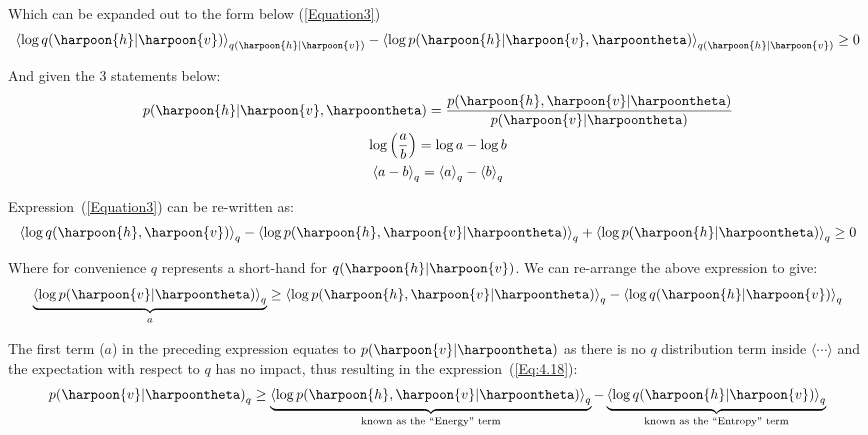 Which can be expanded out to the form below (\ref{Equation3})
\begin{equation}\label{Equation3}
    {\left\langle \log q {(\harpoon{h}|\harpoon{v})}\right\rangle}_{q{(\harpoon{h}|\harpoon{v})}} -
    {\left\langle\log p {(\harpoon{h}|\harpoon{v},\harpoontheta)}\right\rangle}_{q{(\harpoon{h}|\harpoon{v})}}
    \geq 0
\end{equation}

And given the 3 statements below:
\begin{gather}
    p {(\harpoon{h}|\harpoon{v},\harpoontheta)} = 
        \dfrac{ p {(\harpoon{h},\harpoon{v}|\harpoontheta)}}
              { p {(\harpoon{v}|\harpoontheta)}} \\
    \log {\left(\dfrac{a}{b}\right)} = \log a - \log b \\
    {\left\langle a-b \right\rangle}_{q} = {\left\langle a \right\rangle}_{q} - {\left\langle b \right\rangle}_{q}
\end{gather}

Expression~(\ref{Equation3}) can be re-written as:
\begin{equation}
    {\left\langle \log q (\harpoon{h},\harpoon{v}) \right\rangle}_{q} -
    {\left\langle \log p (\harpoon{h},\harpoon{v}|\harpoontheta) \right\rangle}_{q} +
    {\left\langle \log p (\harpoon{h}|\harpoontheta) \right\rangle}_{q}
    \geq 0
\end{equation}

Where for convenience $q$ represents a short-hand for $q( \harpoon{h}|\harpoon{v} )$. We can re-arrange the above expression to give:
\begin{equation}
    \underbrace{{\left\langle \log p (\harpoon{v}|\harpoontheta) \right\rangle}_{q}}_{a}
    \geq
    {\left\langle \log p (\harpoon{h},\harpoon{v}|\harpoontheta) \right\rangle}_{q} -
    {\left\langle \log q (\harpoon{h}|\harpoon{v}) \right\rangle}_{q}
\end{equation}

The first term ($a$) in the preceding expression equates to $p (\harpoon{v}|\harpoontheta)$ as there is no $q$ distribution term inside $\langle\cdots\rangle$ and the expectation with respect to $q$ has no impact, thus resulting in the expression~(\ref{Eq:4.18}):
\begin{equation}\label{Eq:4.18}
    {p (\harpoon{v}|\harpoontheta)}_{q}
    \geq
    \underbrace{{\left\langle \log p (\harpoon{h},\harpoon{v}|\harpoontheta) \right\rangle}_{q}}_{\text{known as the ``Energy'' term}}
    -
    \underbrace{{\left\langle \log q (\harpoon{h}|\harpoon{v}) \right\rangle}_{q}}_{\text{known as the ``Entropy'' term}}
\end{equation}

